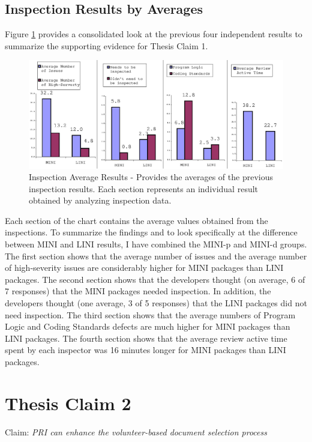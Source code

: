 \subsection{Inspection Results by Averages}
Figure \ref{fig:inspection-results-averages} provides a consolidated look
at the previous four independent results to summarize the supporting
evidence for Thesis Claim 1. 

\begin{figure}[!h]
  \centering
  \includegraphics[width=1.0\textwidth]{figs/Results/inspection-results-averages.eps}
  \caption[Inspection Results - Averages]{Inspection Average Results -
    Provides the averages of the previous inspection results. Each section
    represents an individual result obtained by analyzing inspection data.}
  \label{fig:inspection-results-averages}
\end{figure}

Each section of the chart contains the average values obtained from the
inspections. To summarize the findings and to look specifically at the
difference between MINI and LINI results, I have combined the MINI-p and
MINI-d groups. The first section shows that the average number of issues
and the average number of high-severity issues are considerably higher for
MINI packages than LINI packages. The second section shows that the
developers thought (on average, 6 of 7 responses) that the MINI packages
needed inspection. In addition, the developers thought (one average, 3 of 5
responses) that the LINI packages did not need inspection. The third
section shows that the average numbers of Program Logic and Coding
Standards defects are much higher for MINI packages than LINI packages. The
fourth section shows that the average review active time spent by each
inspector was 16 minutes longer for MINI packages than LINI packages.

\newpage
\section{Thesis Claim 2}
\label{section:claim2}
\noindent Claim: \textit{PRI can enhance the volunteer-based document
  selection process} \newline

